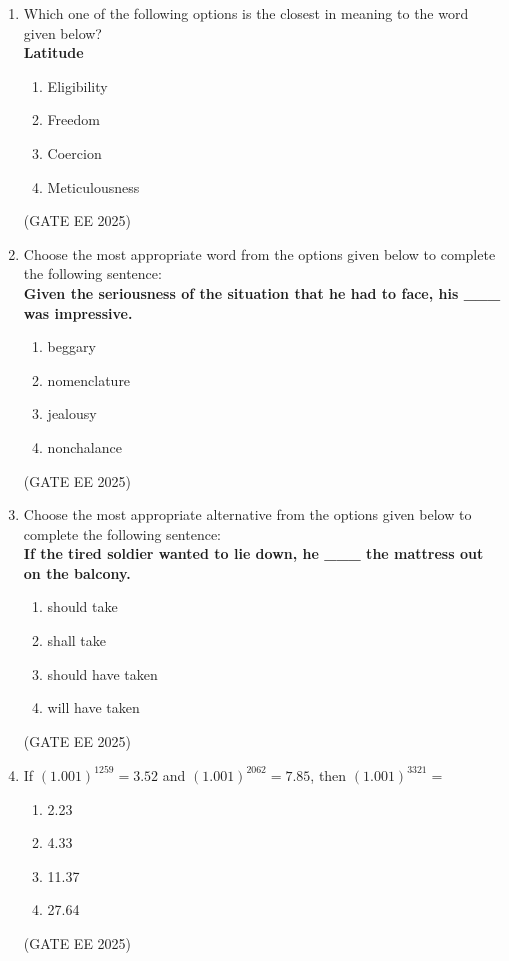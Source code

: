 \documentclass[11pt, letterpaper]{article}
\theoremstyle{remark}
\begin{document}
\begin{enumerate}
\item Which one of the following options is the closest in meaning to the word given below?\\[0.5em]
\textbf{Latitude}
\begin{multicols}{2}
\begin{enumerate}  
\item Eligibility
\item Freedom
\item Coercion
\item Meticulousness
\end{enumerate}
\end{multicols}
\hfill(GATE EE 2025)

\item Choose the most appropriate word from the options given below to complete the following sentence:\\[0.5em]
\textbf{Given the seriousness of the situation that he had to face, his \_\_\_ was impressive.}
\begin{multicols}{2}
\begin{enumerate}  
\item beggary
\item nomenclature
\item jealousy
\item nonchalance
\end{enumerate}
\end{multicols}
\hfill(GATE EE 2025)

\item Choose the most appropriate alternative from the options given below to complete the following sentence:\\[0.5em]
\textbf{If the tired soldier wanted to lie down, he \_\_\_ the mattress out on the balcony.}
\begin{multicols}{2}
\begin{enumerate}  
\item should take
\item shall take
\item should have taken
\item will have taken
\end{enumerate}
\end{multicols}
\hfill(GATE EE 2025)

\item If $(1.001)^{1259} = 3.52$ and $ (1.001)^{2062} = 7.85 $, then $ (1.001)^{3321} = $
\begin{multicols}{2}
\begin{enumerate}  
\item 2.23
\item 4.33
\item 11.37
\item 27.64
\end{enumerate}
\end{multicols}
\hfill(GATE EE 2025)


\end{enumerate}
\end{document}
